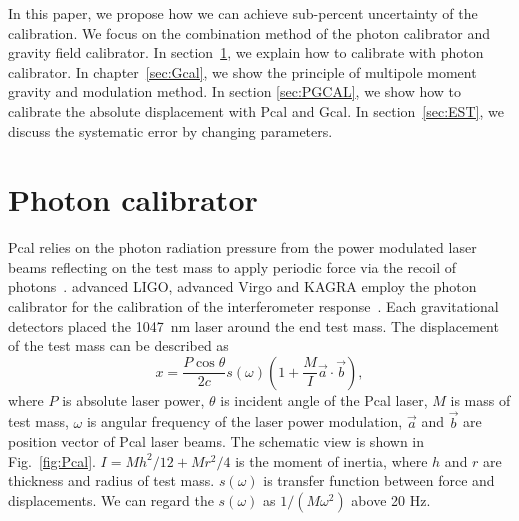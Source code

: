 \documentclass[A4]{spie}  %
\begin{document}
In this paper, we propose how we can achieve sub-percent uncertainty of the calibration. We focus on the combination method of the photon calibrator and gravity field calibrator.
In section~\ref{sec:Pcal}, we explain how to calibrate with photon calibrator. In chapter~\ref{sec:Gcal}, we show the principle of multipole moment gravity and modulation method.
In section \ref{sec:PGCAL}, we show how to calibrate the absolute displacement with Pcal and Gcal. In section~\ref{sec:EST}, we discuss the systematic error by changing parameters.

\section{Photon calibrator} \label{sec:Pcal}
Pcal relies on the photon radiation pressure from the power modulated laser beams reflecting on the test mass to apply periodic force via the recoil of photons~\cite{doi:10.1063/1.4967303}. 
advanced LIGO, advanced Virgo and KAGRA employ the photon calibrator for the calibration of the interferometer response~\cite{0264-9381-34-1-015002, KAGRA_Pcal,0264-9381-32-2-024001}. Each gravitational detectors placed the 1047~nm laser around the end test mass. The displacement of the test mass can be described as
\begin{equation}
 x = \frac{P \cos{\theta}}{2c} s(\omega)\left(1+\frac{M}{I}\vec{a} \cdot \vec{b} \right) , \label{pcal}
\end{equation}
where $P$ is absolute laser power, $\theta$ is incident angle of the Pcal laser, $M$ is mass of test mass, $\omega$ is angular frequency of the laser power modulation, $\vec{a}$ and $\vec{b}$ are position vector of Pcal laser beams. The schematic view is shown in Fig.~\ref{fig:Pcal}. $I=Mh^2/12+Mr^2/4$ is the moment of inertia, where $h$ and  $r$ are thickness and radius of test mass. $s(\omega)$ is transfer function between force and displacements. We can regard the $s(\omega)$ as $1/(M \omega^2)$ above 20 Hz. 
\end{document}

